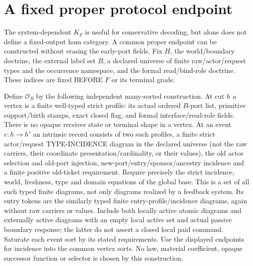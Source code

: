 \documentclass[11pt]{article}
\begin{document}
\section{A fixed proper protocol endpoint}
The system-dependent $K_F$ is useful for conservative decoding, but alone does not define a fixed-output hom category. A common proper endpoint can be constructed without erasing the early-port fields. Fix $H$, the world/boundary doctrine, the external label set $B$, a declared universe of finite raw/actor/request types and the occurrence namespace, and the formal read/bind-role doctrine. These indices are fixed BEFORE $F$ or its terminal grade.

Define $\mathcal O_B$ by the following independent many-sorted construction. At cut $h$ a vertex is a finite well-typed strict profile: its actual ordered $B$-port list, primitive support/birth stamps, exact closed flag, and formal interface/read-role fields. There is no opaque receiver state or terminal shape in a vertex. At an event $e:h\to h'$ an intrinsic record consists of two such profiles, a finite strict actor/request TYPE-INCIDENCE diagram in the declared universe (not the raw carriers, their coordinate presentation/cardinality, or their values), the old actor selection and old-port injection, new-port/entry/sponsor/ancestry incidence and a finite positive old-ticket requirement. Require precisely the strict incidence, world, freshness, type and domain equations of the global base. This is a set of all such typed finite diagrams, not only diagrams realized by a feedback system. Its entry tokens are the similarly typed finite entry-profile/incidence diagrams, again without raw carriers or values. Include both locally active atomic diagrams and externally active diagrams with an empty local active set and actual passive boundary response; the latter do not assert a closed local paid command. Saturate each event sort by its stated requirements. Use the displayed endpoints for incidence into the common vertex sorts. No law, material coefficient, opaque successor function or selector is chosen by this construction.
\end{document}

